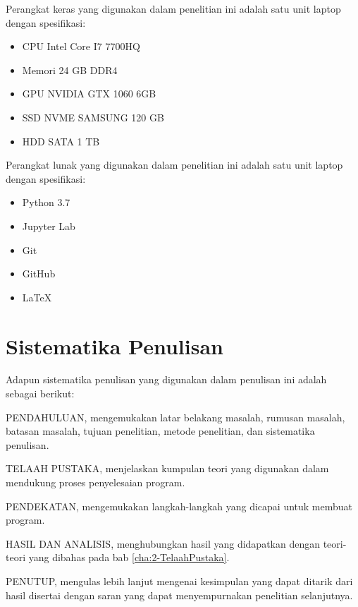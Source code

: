 Perangkat keras yang digunakan dalam penelitian ini adalah satu unit laptop dengan spesifikasi:
\begin{itemize}
  \item CPU Intel Core I7 7700HQ
  \item Memori 24 GB DDR4
  \item GPU NVIDIA GTX 1060 6GB
  \item SSD NVME SAMSUNG 120 GB
  \item HDD SATA 1 TB
\end{itemize}

Perangkat lunak yang digunakan dalam penelitian ini adalah satu unit laptop dengan spesifikasi:
\begin{itemize}
  \item Python 3.7
  \item Jupyter Lab
  \item Git
  \item GitHub
  \item LaTeX
\end{itemize}

\section{Sistematika Penulisan}
\label{sec:1-SistematikaPenulisan}

Adapun sistematika penulisan yang digunakan dalam penulisan ini adalah sebagai berikut:

PENDAHULUAN, mengemukakan latar belakang masalah, rumusan masalah, batasan masalah, tujuan
penelitian, metode penelitian, dan sistematika penulisan.

TELAAH PUSTAKA, menjelaskan kumpulan teori yang digunakan dalam mendukung proses penyelesaian
program.

PENDEKATAN, mengemukakan langkah-langkah yang dicapai untuk membuat program.

HASIL DAN ANALISIS, menghubungkan hasil yang didapatkan dengan teori-teori yang dibahas pada bab
\ref{cha:2-TelaahPustaka}.

PENUTUP, mengulas lebih lanjut mengenai kesimpulan yang dapat ditarik dari hasil disertai dengan
saran yang dapat menyempurnakan penelitian selanjutnya.